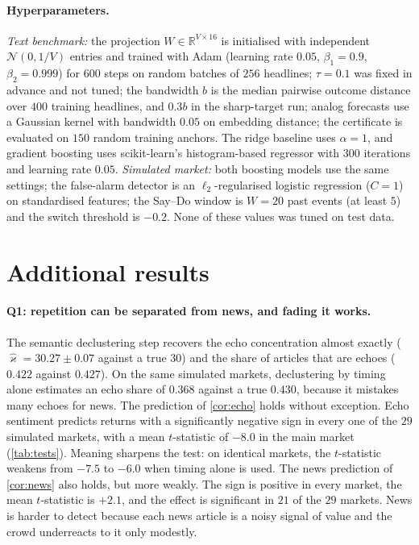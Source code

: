 \documentclass{article}
\theoremstyle{plain}
\theoremstyle{definition}
\theoremstyle{remark}
\newcommand{\R}{\mathbb{R}}
\newcommand{\N}{\mathcal{N}}
\begin{document}
\paragraph{Hyperparameters.} \emph{Text benchmark:} the projection $W\in\R^{V\times16}$ is initialised with independent $\N(0,1/V)$ entries and trained with Adam (learning rate $0.05$, $\beta_1=0.9$, $\beta_2=0.999$) for $600$ steps on random batches of $256$ headlines; $\tau=0.1$ was fixed in advance and not tuned; the bandwidth $b$ is the median pairwise outcome distance over $400$ training headlines, and $0.3b$ in the sharp-target run; analog forecasts use a Gaussian kernel with bandwidth $0.05$ on embedding distance; the certificate is evaluated on $150$ random training anchors. The ridge baseline uses $\alpha=1$, and gradient boosting uses scikit-learn's histogram-based regressor with $300$ iterations and learning rate $0.05$. \emph{Simulated market:} both boosting models use the same settings; the false-alarm detector is an $\ell_2$-regularised logistic regression ($C=1$) on standardised features; the Say--Do window is $W=20$ past events (at least $5$) and the switch threshold is $-0.2$. None of these values was tuned on test data.

\section{Additional results}\label{app:results}
\paragraph{Q1: repetition can be separated from news, and fading it works.} The semantic declustering step recovers the echo concentration almost exactly ($\hat\varkappa=30.27\pm0.07$ against a true $30$) and the share of articles that are echoes ($0.422$ against $0.427$). On the same simulated markets, declustering by timing alone estimates an echo share of $0.368$ against a true $0.430$, because it mistakes many echoes for news. The prediction of \cref{cor:echo} holds without exception. Echo sentiment predicts returns with a significantly negative sign in every one of the $29$ simulated markets, with a mean $t$-statistic of $-8.0$ in the main market (\cref{tab:tests}). Meaning sharpens the test: on identical markets, the $t$-statistic weakens from $-7.5$ to $-6.0$ when timing alone is used. The news prediction of \cref{cor:news} also holds, but more weakly. The sign is positive in every market, the mean $t$-statistic is $+2.1$, and the effect is significant in $21$ of the $29$ markets. News is harder to detect because each news article is a noisy signal of value and the crowd underreacts to it only modestly.
\end{document}

